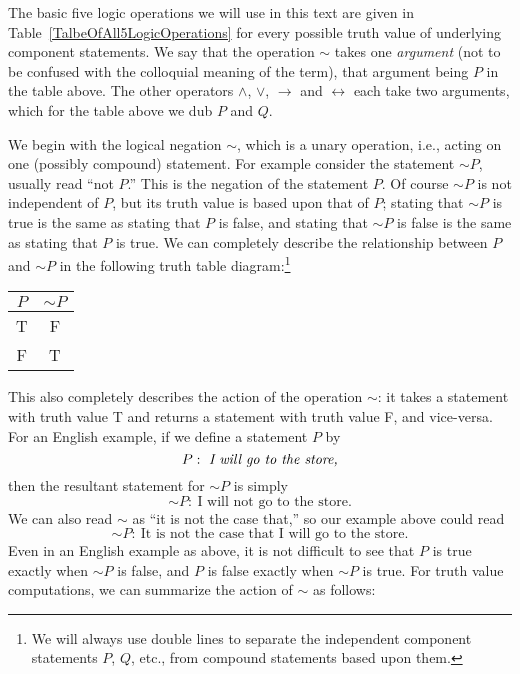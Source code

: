The basic five logic operations we will use in this text are
given in Table~\ref{TalbeOfAll5LogicOperations} for every possible truth
value of underlying component statements.  We say that the operation
$\sim$ takes one {\it argument} (not to be confused with the colloquial
meaning of the term), that argument being $P$
in the table above.  The other operators $\wedge$,
$\vee$, $\rightarrow$ and $\leftrightarrow$ each take two arguments,
which for the table above we dub $P$ and $Q$.





We begin with the logical negation $\sim$, which is a unary operation,
i.e., acting on one (possibly compound)
statement.  For example consider the statement $\sim P$, usually read
``not $P$.''
This is the negation
of the statement $P$.  
Of course $\sim P$ is not independent of $P$, but its 
truth value is based upon that of $P$;
stating that $\sim P$ is true
is the same as stating that $P$ is false, and
stating that $\sim P$ is false is the same
as stating that $P$ is true.  We can completely
describe the relationship between $P$ and $\sim P$
in the following truth table diagram:\footnote{%
We will always use
double lines to separate the independent component statements
$P$, $Q$, etc., from  compound statements based upon them.
}

\medskip

\begin{center}\begin{tabular}{|c||c|}\hline
$P$& $\sim P$\\
\hline
T&F\\
F&T\\\hline\end{tabular}\end{center}
\medskip

\noindent This also completely describes the action of the operation $\sim$:
it takes a statement with truth value T and returns a statement
with truth value F, and vice-versa.  For an English example,
if we define a statement $P$ by
$$P:\ \text{\em I will go to the store,}$$
then the resultant statement for $\sim P$ is simply
$$\sim P:\ \text{I will not go to the store.}$$
We can also read $\sim$ as ``it is not the case that,''
so our example above could read
$$\sim P:\ \text{It is not the case that I will go to the store.}$$
Even in an English example as above,
it is not difficult to see that $P$ is true exactly when
$\sim P$ is false, and $P$ is false exactly when $\sim P$
is true.  For truth value computations, we can summarize
the action of $\sim$ as follows:
 
